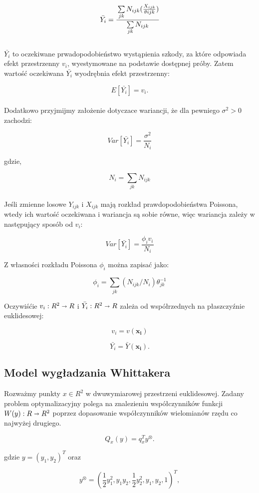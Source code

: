 \documentclass[polish, twoside, 12pt, a4paper]{article}
\theoremstyle{definition}
\theoremstyle{plain}
\theoremstyle{remark}
\begin{document}
\[
\bar{Y_i}=\cfrac{\sum\limits_{jk} N_{ijk} (\frac{X_{ijk}}{\theta{ijk}})}{\sum\limits_{jk} N_{ijk}}
\] \\[0.00001pt]
$\bar{Y_i}$  to oczekiwane prwadopodobieństwo wystąpienia szkody, za które odpowiada efekt przestrzenny \(v_i\), wyestymowane na podstawie dostępnej próby. 
Zatem wartość oczekiwana \(\bar{Y_i}\) wyodrębnia efekt przestrzenny:

\[
E[\bar{Y_{i}}]=v_{i}.
\]\\[0.00001pt] Dodatkowo przyjmijmy założenie dotyczace wariancji, że dla pewniego $\sigma^2 > 0$  zachodzi:

\[
Var[\bar{Y_{i}}]=\frac{\sigma^2}{N_i}
\]


gdzie,

\[
N_i=\sum\limits_{jk}{N_{ijk}}
\]\\[0.00001pt]
Jeśli zmienne losowe $Y_{ijk}$ i $X_{ijk}$ mają rozkład prawdopodobieństwa Poissona, wtedy ich wartość oczekiwana i wariancja są sobie równe, więc wariancja zależy w następujący sposób od $v_{i}$:

\[
Var[\bar{Y_{i}}]=\frac{\phi_{i} v_i}{N_i}
\]

Z własności rozkładu Poissona $\phi_{i}$ można zapisać jako:

\[
\phi_{i}=\sum\limits_{jk}(N_{ijk}/N_{i})\theta^{-1}_{jk}
\]

Oczywiśćie \(v_{i}: R^2 \shortrightarrow R\) i \(\bar{Y_{i}}: R^2 \shortrightarrow R\)  zależa od współrzednych na płaszczyźnie euklidesowej:


\[
v_{i} = v(\boldsymbol{x_i})
\]


\[
\bar{Y_{i}} = \bar{Y}(\boldsymbol{x_i}).
\]




\clearpage
\subsection{Model wygładzania Whittakera}

Rozważmy punkty \(x \in R^2\) w dwuwymiarowej przestrzeni euklidesowej. Zadany problem optymalizacyjny polega na znalezieniu współczynników funkcji \(W (y):R \shortrightarrow R^2 \) poprzez dopasowanie współczynników wielomianów rzędu co najwyżej drugiego.


\[
Q_{x}(y) = q^T_x y^{\otimes}.
\]


gdzie \(y=(y_1,y_2)^T\) oraz

\[
y^{\otimes}=(\frac{1}{2}y_1^2, y_1y_2, \frac{1}{2}y_2^2, y_1, y_2, 1)^T,
\]
\end{document}

